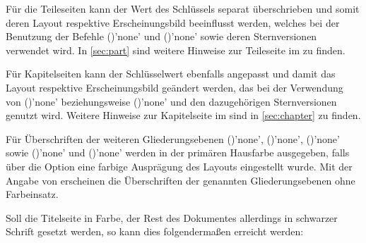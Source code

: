 \begin{Declaration*}{}
\begin{Declaration*}{}
\begin{Declaration*}{}
\begin{Declaration}[%
  v2.03!\Option{cdpart=bicolor}:%
    Farbeinsatz nur im Kopf mit farbig abgesetztem Querbalken;
  v2.03!\Option{cdpart=fullcolor}:%
    voller Farbeinsatz mit farbig abgesetztem Querbalken;
  v2.04!\Option{cdpart=barcolor}:nur farbig abgesetzter Querbalken;%
]{}
\printdeclarationlist%
%
%
Für die Teileseiten kann der Wert des Schlüssels  separat 
überschrieben und somit deren Layout respektive Erscheinungsbild beeinflusst 
werden, welches bei der Benutzung der Befehle 
()'none' und 
()'none' sowie deren Sternversionen 
verwendet wird. In \autoref{sec:part} sind weitere Hinweise zur Teileseite im 
\CD zu finden.
\end{Declaration}

\begin{Declaration}[%
  v2.03!\Option{cdchapter=bicolor}:%
    Farbeinsatz nur im Kopf mit farbig abgesetztem Querbalken;
  v2.03!\Option{cdchapter=fullcolor}:%
    voller Farbeinsatz mit farbig abgesetztem Querbalken;
  v2.04!\Option{cdchapter=barcolor}:nur farbig abgesetzter Querbalken;%
]{}
\printdeclarationlist%
%
%
Für Kapitelseiten kann der Schlüsselwert  ebenfalls angepasst 
und damit das Layout respektive Erscheinungsbild geändert werden, das bei der 
Verwendung von ()'none' beziehungsweise 
()'none' und den dazugehörigen 
Sternversionen genutzt wird. Weitere Hinweise zur Kapitelseite im \CD sind in 
\autoref{sec:chapter} zu finden.
\end{Declaration}

\begin{Declaration}[v2.05]{}
\printdeclarationlist%
%
Für Überschriften der weiteren Gliederungsebenen
()'none', 
()'none', 
()'none' sowie 
()'none' und 
()'none'
werden in der primären Hausfarbe  ausgegeben, falls über die 
Option  eine farbige Ausprägung des Layouts eingestellt wurde. 
Mit der Angabe von  erscheinen die Überschriften der 
genannten Gliederungsebenen ohne Farbeinsatz.
\end{Declaration}
%
\begin{Example}
Soll die Titelseite in Farbe, der Rest des Dokumentes allerdings in schwarzer 
Schrift gesetzt werden, so kann dies folgendermaßen erreicht werden:
%
%
\end{Example}



\end{Declaration*}
\end{Declaration*}
\end{Declaration*}
